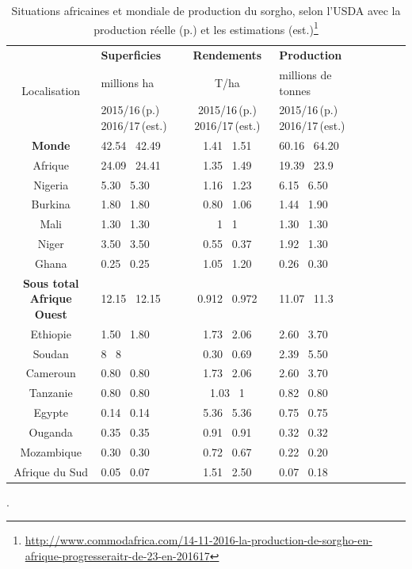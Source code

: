 \documentclass[a4paper,11pt]{article}
\begin{document}
\begin{table}
  \begin{center}
 \begin{tabular}{|c|p{4.5cm}|c|p{4.5cm}|c|p{4.5cm}|c|p{4.5cm}|}
   \hline
   \multirow{3}{*}{Localisation} & \textbf{Superficies}      & \textbf{Rendements}  & \textbf{Production}          \\ \cline{2-3}
                                 & millions ha                 & T/ha                 & millions de tonnes          \\ \cline{2-3}
   & 2015/16\,(p.) 2016/17\,(est.) & 2015/16\,(p.)  2016/17\,(est.) & 2015/16\,(p.) 2016/17\,(est.)        \\ \hline
   \multirow{1}{*}{\textbf{Monde}} & 42.54  \, 42.49 & 1.41  \, 1.51 & 60.16 \, 64.20 \\ \hline
   \multirow{1}{*}{Afrique} & 24.09 \, 24.41 & 1.35 \, 1.49 & 19.39 \, 23.9 \\ \hline
   \multirow{1}{*}{Nigeria} & 5.30  \, 5.30 & 1.16  \, 1.23 & 6.15 \, 6.50 \\ \hline
   \multirow{1}{*}{Burkina} & 1.80  \, 1.80 & 0.80  \, 1.06 & 1.44 \, 1.90 \\ \hline
   \multirow{1}{*}{Mali} & 1.30  \, 1.30 & 1  \, 1  & 1.30  \, 1.30  \\ \hline
   \multirow{1}{*}{Niger} & 3.50  \, 3.50 & 0.55  \, 0.37  & 1.92  \, 1.30  \\ \hline
   \multirow{1}{*}{Ghana} & 0.25  \, 0.25 & 1.05  \, 1.20  & 0.26  \, 0.30  \\ \hline
   \multirow{1}{*}{\textbf{Sous total Afrique Ouest}} & 12.15  \, 12.15 & 0.912 \, 0.972  & 11.07  \, 11.3  \\ \hline
   \multirow{1}{*}{Ethiopie} & 1.50  \, 1.80 & 1.73  \, 2.06  & 2.60  \, 3.70  \\ \hline
   \multirow{1}{*}{Soudan} & 8  \, 8 & 0.30  \, 0.69  & 2.39  \, 5.50  \\ \hline
   \multirow{1}{*}{Cameroun} & 0.80  \, 0.80 & 1.73  \, 2.06  & 2.60  \, 3.70  \\ \hline
   \multirow{1}{*}{Tanzanie} & 0.80  \, 0.80 & 1.03  \, 1  & 0.82  \, 0.80  \\ \hline
   \multirow{1}{*}{Egypte} & 0.14  \, 0.14 & 5.36  \, 5.36  & 0.75  \, 0.75  \\ \hline
   \multirow{1}{*}{Ouganda} & 0.35  \, 0.35 & 0.91  \, 0.91  & 0.32  \, 0.32  \\ \hline
   \multirow{1}{*}{Mozambique} & 0.30  \, 0.30 & 0.72  \, 0.67  & 0.22  \, 0.20  \\ \hline
   \multirow{1}{*}{Afrique du Sud} & 0.05  \, 0.07 & 1.51  \, 2.50  & 0.07  \, 0.18  \\ \hline
  \end{tabular}
 \caption{Situations africaines et mondiale de production du sorgho, selon l’USDA avec la production réelle (p.) et les estimations (est.)\footnote{\url{http://www.commodafrica.com/14-11-2016-la-production-de-sorgho-en-afrique-progresseraitr-de-23-en-201617}}}.
  \end{center}
  \end{table}
  
\end{document}
